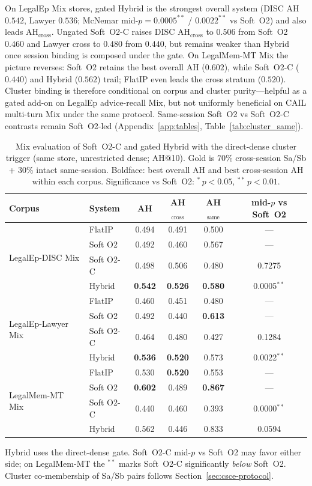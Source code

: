 \documentclass[preprint,12pt,authoryear]{elsarticle}
\newcommand{\compacttab}{\setlength{\tabcolsep}{4.5pt}\renewcommand{\arraystretch}{1.05}}
\begin{document}
On LegalEp Mix stores, gated Hybrid is the strongest overall system (DISC AH $0.542$, Lawyer $0.536$; McNemar mid-$p{=}0.0005^{**}$ / $0.0022^{**}$ vs Soft~O2) and also leads $\mathrm{AH}_{\mathrm{cross}}$.
Ungated Soft~O2-C raises DISC $\mathrm{AH}_{\mathrm{cross}}$ to $0.506$ from Soft~O2 $0.460$ and Lawyer cross to $0.480$ from $0.440$, but remains weaker than Hybrid once session binding is composed under the gate.
On LegalMem-MT Mix the picture reverses: Soft~O2 retains the best overall AH ($0.602$), while Soft~O2-C ($0.440$) and Hybrid ($0.562$) trail; FlatIP even leads the cross stratum ($0.520$).
Cluster binding is therefore conditional on corpus and cluster purity---helpful as a gated add-on on LegalEp advice-recall Mix, but not uniformly beneficial on CAIL multi-turn Mix under the same protocol.
Same-session Soft~O2 vs Soft~O2-C contrasts remain Soft~O2-led (Appendix~\ref{app:tables}, Table~\ref{tab:cluster_same}).

\begin{table}[htbp]
\centering
\caption{Mix evaluation of Soft~O2-C and gated Hybrid with the direct-dense cluster trigger (same store, unrestricted dense; AH@10). Gold is $70$\% cross-session Sa/Sb + $30$\% intact same-session. Boldface: best overall AH and best cross-session AH within each corpus. Significance vs Soft~O2: ${}^{*}\,p{<}0.05$, ${}^{**}\,p{<}0.01$.}
\label{tab:csce}
\compacttab\footnotesize
\begin{tabular}{@{}llcccc@{}}
\toprule
\textbf{Corpus} & \textbf{System} & \textbf{AH} & \textbf{AH$_{\mathrm{cross}}$} & \textbf{AH$_{\mathrm{same}}$} & \textbf{mid-$p$ vs Soft~O2} \\
\midrule
\multirow{4}{*}{LegalEp-DISC Mix}
 & FlatIP & 0.494 & 0.491 & 0.500 & --- \\
 & Soft O2 & 0.492 & 0.460 & 0.567 & --- \\
 & Soft O2-C & 0.498 & 0.506 & 0.480 & 0.7275 \\
 & Hybrid & \textbf{0.542} & \textbf{0.526} & \textbf{0.580} & 0.0005${}^{**}$ \\
\midrule
\multirow{4}{*}{LegalEp-Lawyer Mix}
 & FlatIP & 0.460 & 0.451 & 0.480 & --- \\
 & Soft O2 & 0.492 & 0.440 & \textbf{0.613} & --- \\
 & Soft O2-C & 0.464 & 0.480 & 0.427 & 0.1284 \\
 & Hybrid & \textbf{0.536} & \textbf{0.520} & 0.573 & 0.0022${}^{**}$ \\
\midrule
\multirow{4}{*}{LegalMem-MT Mix}
 & FlatIP & 0.530 & \textbf{0.520} & 0.553 & --- \\
 & Soft O2 & \textbf{0.602} & 0.489 & \textbf{0.867} & --- \\
 & Soft O2-C & 0.440 & 0.460 & 0.393 & 0.0000${}^{**}$ \\
 & Hybrid & 0.562 & 0.446 & 0.833 & 0.0594 \\
\bottomrule
\end{tabular}
\end{table}
{\footnotesize Hybrid uses the direct-dense gate. Soft~O2-C mid-$p$ vs Soft~O2 may favor either side; on LegalMem-MT the ${}^{**}$ marks Soft~O2-C significantly \emph{below} Soft~O2. Cluster co-membership of Sa/Sb pairs follows Section~\ref{sec:csce-protocol}.}
\end{document}
